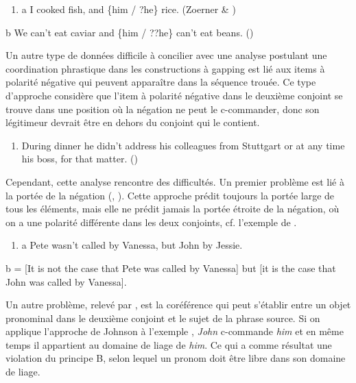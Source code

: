 \begin{enumerate}
\item a   I cooked fish, and \{him / ?he\} rice.        (Zoerner \& \citet{Agbayani2000})


\end{enumerate}
  b  We can't eat caviar and \{him / ??he\} can't eat beans.     (\citet[184]{Winkler2005})

Un autre type de données difficile à concilier avec une analyse postulant une coordination phrastique dans les constructions à gapping est lié aux items à polarité négative qui peuvent apparaître dans la séquence trouée. Ce type d'approche considère que l'item à polarité négative dans le deuxième conjoint se trouve dans une position où la négation ne peut le c-commander, donc son légitimeur devrait être en dehors du conjoint qui le contient.  


\begin{enumerate}
\item During dinner he didn't address his colleagues from Stuttgart or at any time his boss, for that matter.                    (\citet[186]{Winkler2005})


\end{enumerate}
Cependant, cette analyse rencontre des difficultés. Un premier problème est lié à la portée de la négation (\citet{Repp2009}, \citet{Toosarvandani2011}). Cette approche prédit toujours la portée large de tous les éléments, mais elle ne prédit jamais la portée étroite de la négation, où on a une polarité différente dans les deux conjoints, cf. l'exemple de \citet[2]{Repp2009}.


\begin{enumerate}
\item a   Pete wasn't called by Vanessa, but John by Jessie.  


\end{enumerate}
  b  = [It is not the case that Pete was called by Vanessa] but [it is the case that John was called by Vanessa]. 

Un autre problème, relevé par \citet{Ince2009}, est la coréférence qui peut s'établir entre un objet pronominal dans le deuxième conjoint et le sujet de la phrase source. Si on applique l'approche de Johnson à l'exemple , \textit{John} c-commande \textit{him} et en même temps il appartient au domaine de liage de \textit{him}. Ce qui a comme résultat une violation du principe B, selon lequel un pronom doit être libre dans son domaine de liage.


